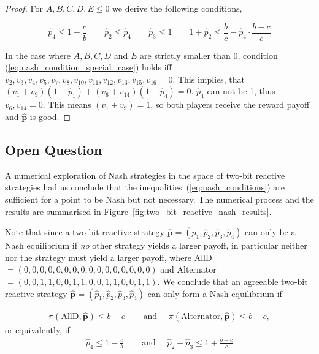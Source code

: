 \documentclass{article}
\theoremstyle{definition}
\begin{document}
\begin{proof}
    For \(A, B, C, D, E \leq 0\) we derive the following conditions,
    \vspace{-.5cm}

    \begin{equation}\label{eq:nash_conditions}
    \hat{p}_4  \leq 1 - \frac{c}{b} \qquad
    \hat{p}_2  \leq \hat{p}_4 \qquad
    \hat{p}_3  \leq 1 \qquad
    1 + \hat{p}_2 \leq \frac{b}{c} - \hat{p}_4 \cdot \frac{b\!-\!c}{c}
    \end{equation}

    In the case where \(A, B, C, D\) and \(E\) are strictly smaller than 0, condition
    (\ref{eq:nash_condition_special_case}) holds iff \(v_2, v_3,
    v_4, v_5, v_7, v_8, v_{10},
    v_{11}, \allowbreak v_{12}, v_{13}, v_{15}, v_{16} =
    0\). This implies, that \((v_1 + v_9) (1 - \hat{p}_1) + (v_6 +
    v_{14}) (1 - \hat{p}_4) = 0\). \(\hat{p}_4\) can not be 1, thus \(v_6,
    v_{14} = 0\). This means \((v_1 + v_9) = 1\), so both
    players receive the reward payoff and \(\mathbf{\hat{p}}\) is good.
\end{proof}

\subsection{Open Question}

A numerical exploration of Nash strategies in the space of two-bit reactive
strategies had us conclude that the inequalities~(\ref{eq:nash_conditions}) are
sufficient for a point to be Nash but not necessary. The numerical process and
the results are summarised in Figure~\ref{fig:two_bit_reactive_nash_results}.

Note that since a two-bit reactive strategy \(\mathbf{\hat{p}} = (\hat{p}_{1},
\hat{p}_{2}, \hat{p}_{3}, \hat{p}_{4})\) can only be a Nash equilibrium if {\it no} other strategy yields a larger payoff,  in particular neither  nor the  strategy must yield a larger payoff, where
AllD\(=(0, 0, 0, 0, 0, 0, 0, 0, 0, 0, 0, 0, 0, 0, 0, 0)\) and
Alternator\(=(0, 0, 1, 1, 0, 0, 1, 1, 0, 0, 1, 1, 0, 0, 1, 1)\).
We conclude that an agreeable two-bit reactive strategy  \(\mathbf{\hat{p}} = (\hat{p}_{1}, \hat{p}_{2}, \hat{p}_{3}, \hat{p}_{4})\) can only form a Nash equilibrium if 

\begin{align*}
\pi(\text{AllD}, \mathbf{\hat{p}}) \leq b\!-\!c & \quad \text{ and } \quad \pi(\text{Alternator}, \mathbf{\hat{p}}) \leq b\!-\!c,
\end{align*}
or equivalently, if
\begin{align}\label{Eq:NashConditionDonationGame}
  \hat{p}_4 \leq 1 - \frac{c}{b} & \quad \text{ and } \quad  \hat{p}_2 + \hat{p}_3 \leq 1 + \frac{b\!-\!c}{c}
\end{align}
\end{document}
